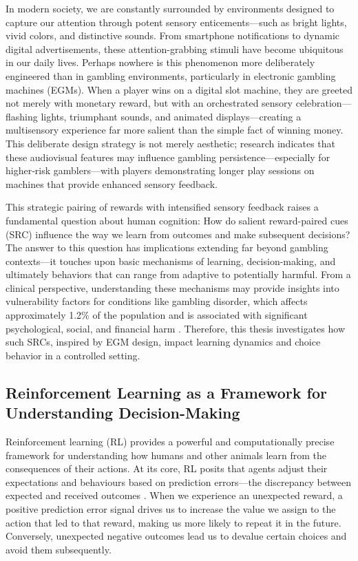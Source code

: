 In modern society, we are constantly surrounded by environments designed to capture our attention through potent sensory enticements—such as bright lights, vivid colors, and distinctive sounds. From smartphone notifications to dynamic digital advertisements, these attention-grabbing stimuli have become ubiquitous in our daily lives. Perhaps nowhere is this phenomenon more deliberately engineered than in gambling environments, particularly in electronic gambling machines (EGMs). When a player wins on a digital slot machine, they are greeted not merely with monetary reward, but with an orchestrated sensory celebration—flashing lights, triumphant sounds, and animated displays—creating a multisensory experience far more salient than the simple fact of winning money. This deliberate design strategy is not merely aesthetic; research indicates that these audiovisual features may influence gambling persistence—especially for higher‑risk gamblers—with players demonstrating longer play sessions on machines that provide enhanced sensory feedback.

This strategic pairing of rewards with intensified sensory feedback raises a fundamental question about human cognition: How do salient reward-paired cues (SRC) influence the way we learn from outcomes and make subsequent decisions? The answer to this question has implications extending far beyond gambling contexts—it touches upon basic mechanisms of learning, decision-making, and ultimately behaviors that can range from adaptive to potentially harmful. From a clinical perspective, understanding these mechanisms may provide insights into vulnerability factors for conditions like gambling disorder, which affects approximately 1.2\% of the population and is associated with significant psychological, social, and financial harm \citep{who2024}. Therefore, this thesis investigates how such SRCs, inspired by EGM design, impact learning dynamics and choice behavior in a controlled setting.

\subsection{Reinforcement Learning as a Framework for Understanding Decision-Making}

Reinforcement learning (RL) provides a powerful and computationally precise framework for understanding how humans and other animals learn from the consequences of their actions. At its core, RL posits that agents adjust their expectations and behaviours based on prediction errors—the discrepancy between expected and received outcomes \citep{sutton2020}. When we experience an unexpected reward, a positive prediction error signal drives us to increase the value we assign to the action that led to that reward, making us more likely to repeat it in the future. Conversely, unexpected negative outcomes lead us to devalue certain choices and avoid them subsequently.

